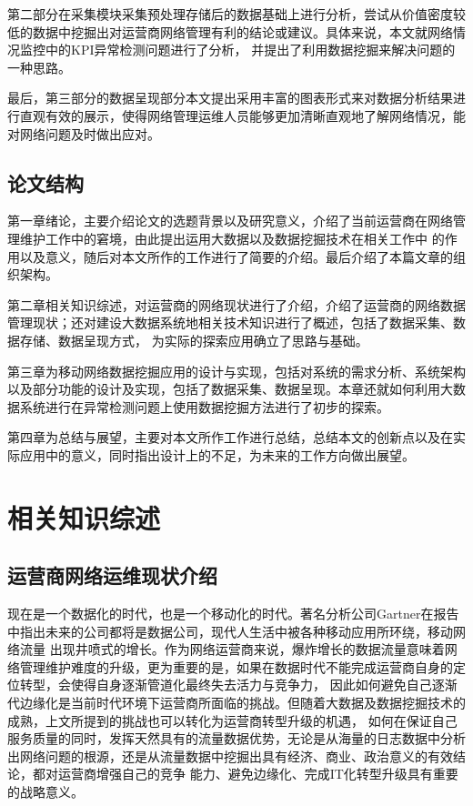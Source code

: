 \documentclass{HustGraduPaper}
\begin{document}
    第二部分在采集模块采集预处理存储后的数据基础上进行分析，尝试从价值密度较低的数据中挖掘出对运营商网络管理有利的结论或建议。具体来说，本文就网络情况监控中的KPI异常检测问题进行了分析，
    并提出了利用数据挖掘来解决问题的一种思路。

    最后，第三部分的数据呈现部分本文提出采用丰富的图表形式来对数据分析结果进行直观有效的展示，使得网络管理运维人员能够更加清晰直观地了解网络情况，能对网络问题及时做出应对。

    \subsection{论文结构}

    第一章绪论，主要介绍论文的选题背景以及研究意义，介绍了当前运营商在网络管理维护工作中的窘境，由此提出运用大数据以及数据挖掘技术在相关工作中
    的作用以及意义，随后对本文所作的工作进行了简要的介绍。最后介绍了本篇文章的组织架构。

    第二章相关知识综述，对运营商的网络现状进行了介绍，介绍了运营商的网络数据管理现状；还对建设大数据系统地相关技术知识进行了概述，包括了数据采集、数据存储、数据呈现方式，
    为实际的探索应用确立了思路与基础。

    第三章为移动网络数据挖掘应用的设计与实现，包括对系统的需求分析、系统架构以及部分功能的设计及实现，包括了数据采集、数据呈现。本章还就如何利用大数据系统进行在异常检测问题上使用数据挖掘方法进行了初步的探索。

    第四章为总结与展望，主要对本文所作工作进行总结，总结本文的创新点以及在实际应用中的意义，同时指出设计上的不足，为未来的工作方向做出展望。

    \clearpage
    \section{相关知识综述}

    \subsection{运营商网络运维现状介绍}

    现在是一个数据化的时代，也是一个移动化的时代。著名分析公司Gartner在报告中指出未来的公司都将是数据公司，现代人生活中被各种移动应用所环绕，移动网络流量
    出现井喷式的增长。作为网络运营商来说，爆炸增长的数据流量意味着网络管理维护难度的升级，更为重要的是，如果在数据时代不能完成运营商自身的定位转型，会使得自身逐渐管道化最终失去活力与竞争力，
    因此如何避免自己逐渐代边缘化是当前时代环境下运营商所面临的挑战。但随着大数据及数据挖掘技术的成熟，上文所提到的挑战也可以转化为运营商转型升级的机遇，
    如何在保证自己服务质量的同时，发挥天然具有的流量数据优势，无论是从海量的日志数据中分析出网络问题的根源，还是从流量数据中挖掘出具有经济、商业、政治意义的有效结论，都对运营商增强自己的竞争
    能力、避免边缘化、完成IT化转型升级具有重要的战略意义。
\end{document}
